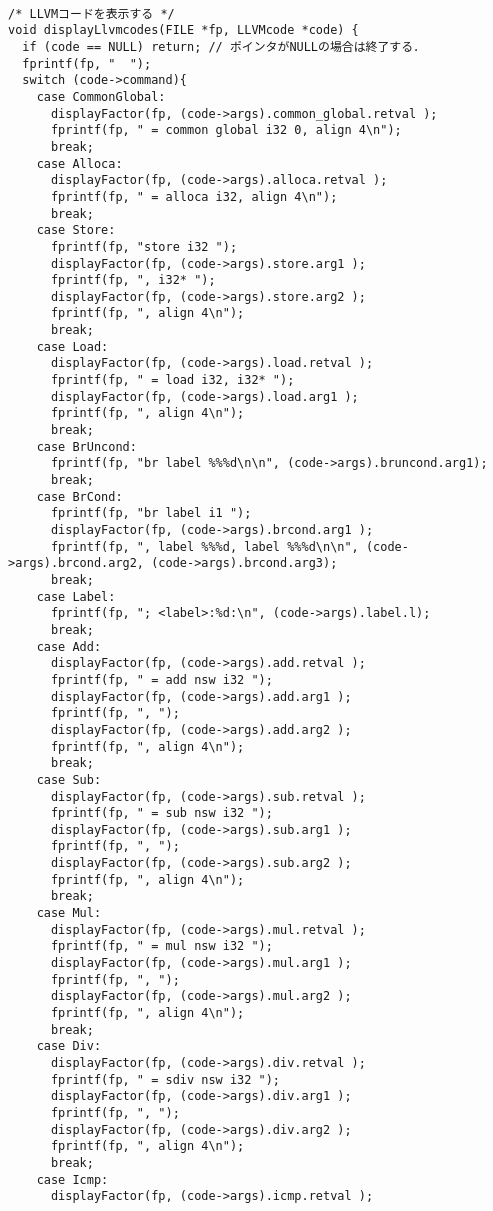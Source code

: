 \documentclass[uplatex]{jsarticle}
\begin{document}
\begin{lstlisting}[caption=displayLlvmcodes関数の定義,label=lst:ex4:llvm.c:displayLlvmcodes]

/* LLVMコードを表示する */
void displayLlvmcodes(FILE *fp, LLVMcode *code) {
  if (code == NULL) return; // ポインタがNULLの場合は終了する．
  fprintf(fp, "  ");
  switch (code->command){
    case CommonGlobal:
      displayFactor(fp, (code->args).common_global.retval );
      fprintf(fp, " = common global i32 0, align 4\n");
      break;
    case Alloca:
      displayFactor(fp, (code->args).alloca.retval );
      fprintf(fp, " = alloca i32, align 4\n");
      break;
    case Store:
      fprintf(fp, "store i32 ");
      displayFactor(fp, (code->args).store.arg1 );
      fprintf(fp, ", i32* ");
      displayFactor(fp, (code->args).store.arg2 );
      fprintf(fp, ", align 4\n");
      break;
    case Load:
      displayFactor(fp, (code->args).load.retval );
      fprintf(fp, " = load i32, i32* ");
      displayFactor(fp, (code->args).load.arg1 );
      fprintf(fp, ", align 4\n");
      break;
    case BrUncond:
      fprintf(fp, "br label %%%d\n\n", (code->args).bruncond.arg1);
      break;
    case BrCond:
      fprintf(fp, "br label i1 ");
      displayFactor(fp, (code->args).brcond.arg1 );
      fprintf(fp, ", label %%%d, label %%%d\n\n", (code->args).brcond.arg2, (code->args).brcond.arg3);
      break;
    case Label:
      fprintf(fp, "; <label>:%d:\n", (code->args).label.l);
      break;
    case Add:
      displayFactor(fp, (code->args).add.retval );
      fprintf(fp, " = add nsw i32 ");
      displayFactor(fp, (code->args).add.arg1 );
      fprintf(fp, ", ");
      displayFactor(fp, (code->args).add.arg2 );
      fprintf(fp, ", align 4\n");
      break;
    case Sub:
      displayFactor(fp, (code->args).sub.retval );
      fprintf(fp, " = sub nsw i32 ");
      displayFactor(fp, (code->args).sub.arg1 );
      fprintf(fp, ", ");
      displayFactor(fp, (code->args).sub.arg2 );
      fprintf(fp, ", align 4\n");
      break;
    case Mul:
      displayFactor(fp, (code->args).mul.retval );
      fprintf(fp, " = mul nsw i32 ");
      displayFactor(fp, (code->args).mul.arg1 );
      fprintf(fp, ", ");
      displayFactor(fp, (code->args).mul.arg2 );
      fprintf(fp, ", align 4\n");
      break;
    case Div:
      displayFactor(fp, (code->args).div.retval );
      fprintf(fp, " = sdiv nsw i32 ");
      displayFactor(fp, (code->args).div.arg1 );
      fprintf(fp, ", ");
      displayFactor(fp, (code->args).div.arg2 );
      fprintf(fp, ", align 4\n");
      break;
    case Icmp:
      displayFactor(fp, (code->args).icmp.retval );

\end{lstlisting}
\end{document}
